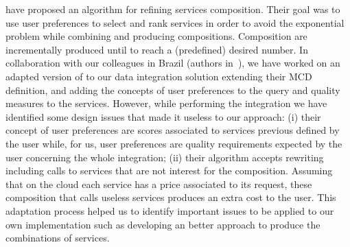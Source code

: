 \documentclass[11pt,a4paper,oneside]{report}
\begin{document}
\cite{ba2014} have proposed an algorithm for refining services composition. Their goal was to use user preferences to select and rank services in order to avoid the exponential problem while combining and producing compositions. Composition are incrementally produced until to reach a (predefined) desired number. In collaboration with our colleagues in Brazil (authors in~\cite{ba2014}), we have worked on an adapted version of \cite{ba2014} to our data integration solution extending their MCD definition, and adding the concepts of user preferences to the query and quality measures to the services. However, while performing the integration we have identified some design issues that made it useless to our approach: (i) their concept of user preferences are scores associated to services previous defined by the user while, for us, user preferences are quality requirements expected by the user concerning the whole integration; (ii) their algorithm accepts rewriting including calls to services that are not interest for the composition. Assuming that on the cloud each service has a price associated to its request, these composition that calls useless services produces an extra cost to the user. This adaptation process helped us to identify important issues to be applied to our own implementation such as developing an better approach to produce the combinations of services.


\end{document}
